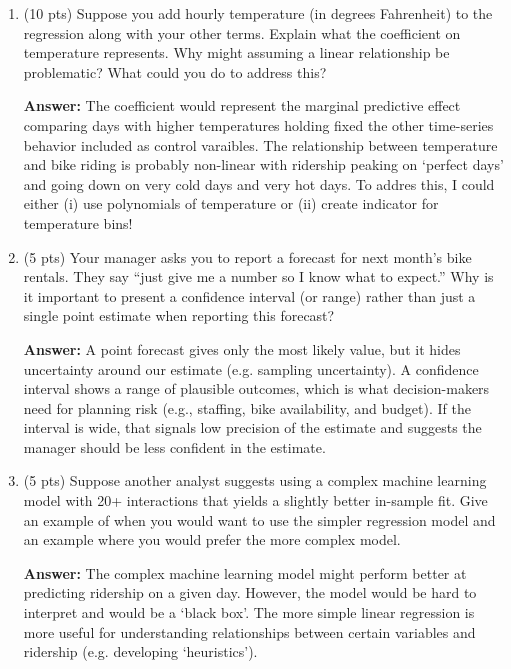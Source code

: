 \documentclass[12pt]{article}
\newcommand{\answer}[1]{{\color{blue_winged_teal}\textbf{Answer:} #1}}
\newcommand{\pts}[1]{{\color{zinc500}(#1 pts)}}
\begin{document}
\begin{enumerate}
\begin{enumerate}
      \answer{
        Add an indicator variable for the month of January 2024.
        Look at the coefficient on that variable and test whether that coefficient is significantly different from 0.
      }

      \item \pts{10} Suppose you add hourly temperature (in degrees Fahrenheit) to the regression along with your other terms. Explain what the coefficient on temperature represents.
        Why might assuming a linear relationship be problematic?
        What could you do to address this?

      \answer{
        The coefficient would represent the marginal predictive effect comparing days with higher temperatures holding fixed the other time-series behavior included as control varaibles.
        The relationship between temperature and bike riding is probably non-linear with ridership peaking on `perfect days' and going down on very cold days and very hot days. 
        To addres this, I could either (i) use polynomials of temperature or (ii) create indicator for temperature bins!
      }

      \item \pts{5} Your manager asks you to report a forecast for next month's bike rentals.
        They say ``just give me a number so I know what to expect.''
        Why is it important to present a confidence interval (or range) rather than just a single point estimate when reporting this forecast?

      \answer{
        A point forecast gives only the most likely value, but it hides uncertainty around our estimate (e.g. sampling uncertainty).
        A confidence interval shows a range of plausible outcomes, which is what decision-makers need for planning risk (e.g., staffing, bike availability, and budget).
        If the interval is wide, that signals low precision of the estimate and suggests the manager should be less confident in the estimate.
      }

      \item \pts{5} Suppose another analyst suggests using a complex machine learning model with 20+ interactions that yields a slightly better in-sample fit.
        Give an example of when you would want to use the simpler regression model and an example where you would prefer the more complex model.

      \answer{
        The complex machine learning model might perform better at predicting ridership on a given day.
        However, the model would be hard to interpret and would be a `black box'. 
        The more simple linear regression is more useful for understanding relationships between certain variables and ridership (e.g. developing `heuristics').
      }
    \end{enumerate}


\end{enumerate}
\end{document}
